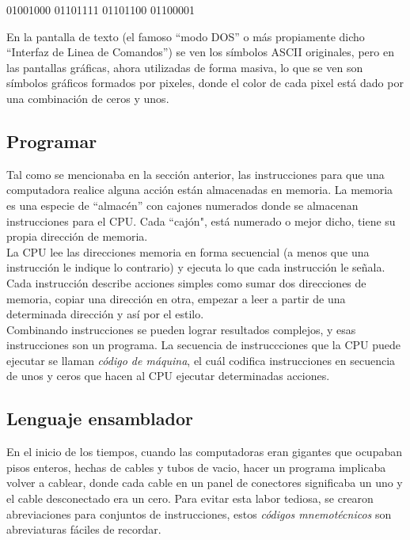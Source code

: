 \begin{center}
01001000 01101111 01101100 01100001
\end{center}

En la pantalla de texto (el famoso ``modo DOS'' o más propiamente dicho ``Interfaz de Linea de Comandos'') se ven los símbolos ASCII originales, pero en las pantallas gráficas, ahora utilizadas de forma masiva, lo que se ven son símbolos gráficos formados por pixeles, donde el color de cada pixel está dado por una combinación de ceros y unos.

\subsection{Programar}

Tal como se mencionaba en la sección anterior, las instrucciones para que una computadora realice alguna acción están almacenadas en memoria. La memoria es una especie de ``almacén'' con cajones numerados donde se almacenan instrucciones para el CPU. Cada ``cajón", está numerado o mejor dicho, tiene su propia dirección de memoria. \\

La CPU lee las direcciones memoria en forma secuencial (a menos que una instrucción le indique lo contrario) y ejecuta lo que cada instrucción le señala. Cada instrucción describe acciones simples como sumar dos direcciones de memoria, copiar una dirección en otra, empezar a leer a partir de una determinada dirección y así por el estilo.\\

Combinando instrucciones se pueden lograr resultados complejos, y esas instrucciones son un programa. La secuencia de instruccciones que la CPU puede ejecutar se llaman \textit{código de máquina}, el cuál codifica instrucciones en secuencia de unos y ceros que hacen al CPU ejecutar determinadas acciones.\\

\subsection{Lenguaje ensamblador}

En el inicio de los tiempos, cuando las computadoras eran gigantes que ocupaban pisos enteros, hechas de cables y tubos de vacio, hacer un programa implicaba volver a cablear, donde cada cable en un panel de conectores significaba un uno y el cable desconectado era un cero. Para evitar esta labor tediosa, se crearon abreviaciones para conjuntos de instrucciones, estos \textit{códigos mnemotécnicos} son abreviaturas fáciles de recordar.\\


